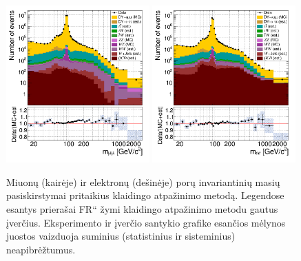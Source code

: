 \documentclass[a4paper, 12pt, oneside]{article}
\newcommand{\ltq}[1]{{\quotedblbase{}#1\textquotedblleft{}}}
\newlength\q
\begin{document}
\begin{figure}[t!]
	\includegraphics[width=0.49\textwidth]{Magistrinis/MuMumass_afterFR.png}
	\includegraphics[width=0.49\textwidth]{Magistrinis/EEmass_afterFR.png}
	\vspace{-0.3cm}
	\caption{\label{fig:MassFinal}
		Miuonų (kairėje) ir elektronų (dešinėje) porų invariantinių masių pasiskirstymai pritaikius klaidingo atpažinimo metodą.
		Legendose esantys prierašai \ltq{FR} žymi klaidingo atpažinimo metodu gautus įverčius.
		Eksperimento ir įverčio santykio grafike esančios mėlynos juostos vaizduoja suminius (statistinius ir sisteminius)
		neapibrėžtumus.}
\end{figure}


\newpage
\end{document}
